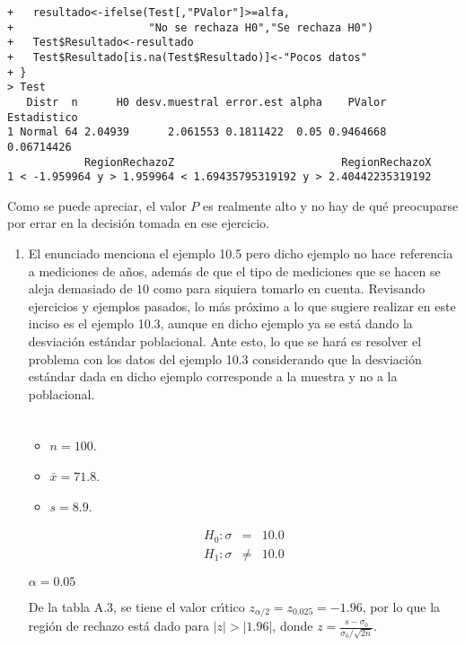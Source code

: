 \begin{solucion}
\begin{verbatim}
+   resultado<-ifelse(Test[,"PValor"]>=alfa,
+                     "No se rechaza H0","Se rechaza H0")
+   Test$Resultado<-resultado
+   Test$Resultado[is.na(Test$Resultado)]<-"Pocos datos"
+ }
> Test
   Distr  n      H0 desv.muestral error.est alpha    PValor Estadistico
1 Normal 64 2.04939      2.061553 0.1811422  0.05 0.9464668  0.06714426
            RegionRechazoZ                          RegionRechazoX
1 < -1.959964 y > 1.959964 < 1.69435795319192 y > 2.40442235319192
 \end{verbatim}
 Como se puede apreciar, el valor $P$ es realmente alto
 y no hay de qu\'e preocuparse por errar en la decisi\'on
 tomada en ese ejercicio.
 \begin{enumerate}
  \item El enunciado menciona el ejemplo 10.5
  pero dicho ejemplo no hace referencia a mediciones de a\~nos,
  adem\'as de que el tipo de mediciones que se hacen se aleja demasiado de $10$
  como para siquiera tomarlo en cuenta.
  Revisando ejercicios y ejemplos pasados, lo m\'as pr\'oximo
  a lo que sugiere realizar en este inciso es el ejemplo 10.3,
  aunque en dicho ejemplo ya se est\'a dando la desviaci\'on est\'andar
  poblacional.
  Ante esto, lo que se har\'a es resolver el problema con los datos del ejemplo
  10.3 considerando que la desviaci\'on est\'andar dada en dicho ejemplo
  corresponde a la muestra y no a la poblacional.
  \begin{datos}
   $\phantom{0}$
   \begin{itemize}
    \item $n = 100$.
    \item $\bar{x} = 71.8$.
    \item $s = 8.9$.
   \end{itemize}
  \end{datos}

  \begin{hipotesis}
   \begin{eqnarray*}
    H_0: \sigma &  =   & 10.0 \\
    H_1: \sigma & \neq & 10.0
   \end{eqnarray*}
  \end{hipotesis}

  \begin{significancia}
   $\alpha = 0.05$
  \end{significancia}

  \begin{region}
   De la tabla A.3, se tiene el valor cr\'{\i}tico
   $z_{\alpha/2} = z_{0.025} = -1.96$,
   por lo que la regi\'on de rechazo est\'a dado para $|z| > |1.96|$,
   donde $z = \frac{s-\sigma_0}{\sigma_0/\sqrt{2n}}$.
  \end{region}


\end{enumerate}
\end{solucion}
